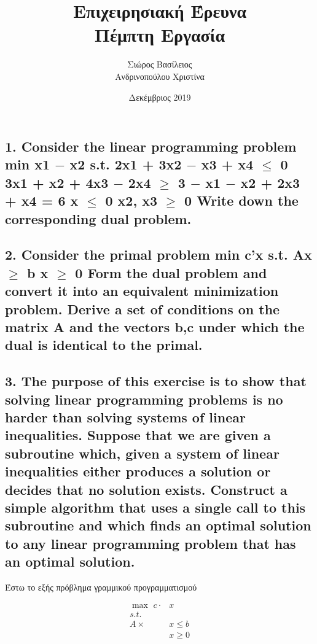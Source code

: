 \documentclass[12pt]{article}
\title{\hugeΑλγοριθμική Επιχειρησιακή Έρευνα\\Πέμπτη Εργασία}
\author{Σιώρος Βασίλειος\\Ανδρινοπούλου Χριστίνα}
\date{Δεκέμβριος 2019}
\newcommand{\margin}{\hspace{4pt}}
\begin{document}
\maketitle


\pagebreak


\subsection*{1. Consider the linear programming problem
min x1 \ensuremath{-} x2
s.t. 2x1 + 3x2 \ensuremath{-} x3 + x4 \ensuremath{\leq} 0
3x1 + x2 + 4x3 \ensuremath{-} 2x4 \ensuremath{\geq} 3
\ensuremath{-} x1 \ensuremath{-} x2 + 2x3 + x4 = 6
x \ensuremath{\leq} 0
x2, x3 \ensuremath{\geq} 0
Write down the corresponding dual problem.}

\vspace{2in}

\pagebreak

\subsection*{2. Consider the primal problem
min c'x
s.t. Ax \ensuremath{\geq} b
x \ensuremath{\geq} 0
Form the dual problem and convert it into an equivalent minimization problem. Derive a set of
conditions on the matrix A and the vectors b,c under which the dual is identical to the primal.}

\vspace{2in}

\pagebreak

\subsection*{3. The purpose of this exercise is to show that solving linear programming
problems is no harder than solving systems of linear inequalities. Suppose that we are given
a subroutine which, given a system of linear inequalities either produces a solution or decides
that no solution exists. Construct a simple algorithm that uses a single call to this subroutine
and which finds an optimal solution to any linear programming problem that has an optimal
solution.}

Έστω το εξής πρόβλημα γραμμικού προγραμματισμού

\begin{align*}
    \max \margin c \cdot & x \\
    s.t. \\
    A \times & x \leq b \\
    & x \geq 0
\end{align*}
\end{document}

